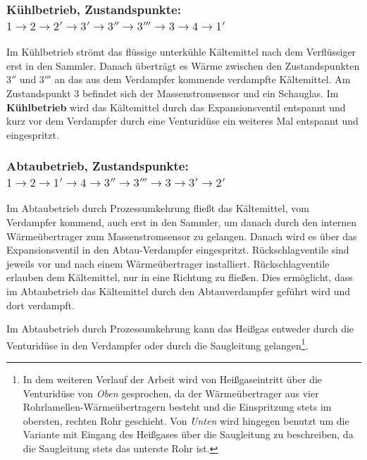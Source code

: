 \subsubsection{Kühlbetrieb, Zustandspunkte: $1 \rightarrow 2 \rightarrow 2'\rightarrow 3' \rightarrow 3''\rightarrow  3''' \rightarrow 3 \rightarrow 4 \rightarrow 1' $}

Im Kühlbetrieb strömt das flüssige unterkühle Kältemittel nach dem Verflüssiger erst in den Sammler. Danach überträgt es Wärme zwischen den Zustandspunkten $3''$ und $3'''$ an das aus dem Verdampfer kommende verdampfte Kältemittel. Am Zustandspunkt $3$ befindet sich der Massenstromsensor und ein Schauglas.  
Im \textbf{Kühlbetrieb} wird das Kältemittel durch das Expansionsventil entspannt und kurz vor dem Verdampfer durch eine Venturidüse ein weiteres Mal entspannt und eingespritzt.

\subsubsection*{Abtaubetrieb, Zustandspunkte: $1 \rightarrow 2 \rightarrow 1'\rightarrow 4 \rightarrow 3''\rightarrow  3''' \rightarrow 3 \rightarrow 3' \rightarrow 2' $}

Im Abtaubetrieb durch Prozessumkehrung fließt das Kältemittel, vom Verdampfer kommend, auch erst in den Sammler, um danach durch den internen Wärmeübertrager zum Massenstromsensor zu gelangen. Danach wird es über das Expansionsventil in den Abtau-Verdampfer eingespritzt. Rückschlagventile sind jeweils vor und nach einem Wärmeübertrager installiert. Rückschlagventile erlauben dem Kältemittel, nur in eine Richtung zu fließen. Dies ermöglicht, dass im Abtaubetrieb das Kältemittel durch den Abtauverdampfer geführt wird und dort verdampft. 

Im Abtaubetrieb durch Prozessumkehrung kann das Heißgas entweder durch die Venturidüse in den Verdampfer  oder durch die Saugleitung gelangen\footnote{In dem weiteren Verlauf der Arbeit wird von Heißgaseintritt über die Venturidüse von \textit{Oben} gesprochen, da der Wärmeübertrager aus vier Rohrlamellen-Wärmeübertragern besteht und die Einspritzung stets im obersten, rechten  Rohr geschieht. Von \textit{Unten} wird hingegen benutzt um die Variante mit Eingang des Heißgases über die Saugleitung zu beschreiben, da die Saugleitung stets das unterste Rohr ist.}.  









